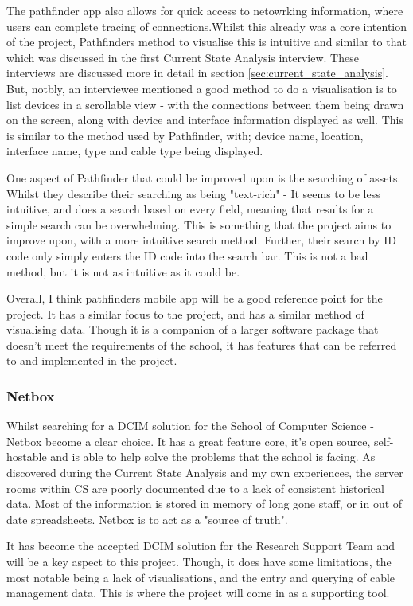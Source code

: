 \documentclass [12pt,letterpaper]{article}
\begin{document}
The pathfinder app also allows for quick access to netowrking information, where users can complete tracing of connections.Whilst this already was a core intention of the project, Pathfinders method to visualise this is intuitive and similar to that which was discussed in the first Current State Analysis interview. These interviews are discussed more in detail in section \ref{sec:current_state_analysis}. But, notbly, an interviewee mentioned a good method to do a visualisation is to list devices in a scrollable view - with the connections between them being drawn on the screen, along with device and interface information displayed as well. This is similar to the method used by Pathfinder, with; device name, location, interface name, type and cable type being displayed. 

One aspect of Pathfinder that could be improved upon is the searching of assets. Whilst they describe their searching as being "text-rich" - It seems to be less intuitive, and does a search based on every field, meaning that results for a simple search can be overwhelming. This is something that the project aims to improve upon, with a more intuitive search method. Further, their search by ID code only simply enters the ID code into the search bar. This is not a bad method, but it is not as intuitive as it could be. 

Overall, I think pathfinders mobile app will be a good reference point for the project. It has a similar focus to the project, and has a similar method of visualising data. Though it is a companion of a larger software package that doesn't meet the requirements of the school, it has features that can be referred to and implemented in the project.

\subsubsection{Netbox}
\label{sec:netbox}
Whilst searching for a DCIM solution for the School of Computer Science - Netbox become a clear choice. It has a great feature core, it's open source, self-hostable and is able to help solve the problems that the school is facing. As discovered during the Current State Analysis and my own experiences, the server rooms within CS are poorly documented due to a lack of consistent historical data. Most of the information is stored in memory of long gone staff, or in out of date spreadsheets. Netbox is to act as a "source of truth"\cite{Netbox}. 

It has become the accepted DCIM solution for the Research Support Team and will be a key aspect to this project. Though, it does have some limitations, the most notable being a lack of visualisations, and the entry and querying of cable management data. This is where the project will come in as a supporting tool. 
\end{document}
